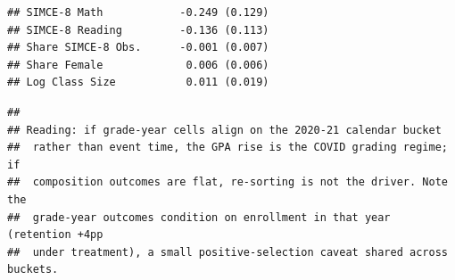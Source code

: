 \documentclass[
]{article}
\begin{document}
\begin{verbatim}
## SIMCE-8 Math            -0.249 (0.129)
## SIMCE-8 Reading         -0.136 (0.113)
## Share SIMCE-8 Obs.      -0.001 (0.007)
## Share Female             0.006 (0.006)
## Log Class Size           0.011 (0.019)
\end{verbatim}

\begin{verbatim}
## 
## Reading: if grade-year cells align on the 2020-21 calendar bucket
##  rather than event time, the GPA rise is the COVID grading regime; if
##  composition outcomes are flat, re-sorting is not the driver. Note the
##  grade-year outcomes condition on enrollment in that year (retention +4pp
##  under treatment), a small positive-selection caveat shared across buckets.
\end{verbatim}
\end{document}
